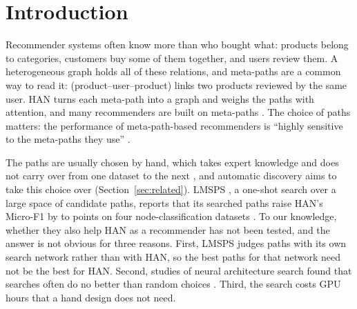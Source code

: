\section{Introduction}
\label{sec:intro}

Recommender systems often know more than who bought what: products belong to categories,
customers buy some of them together, and users review them. A heterogeneous graph holds all of
these relations, and meta-paths are a common way to read it:  (product--user--product)
links two products reviewed by the same user. HAN \citep{wang2019heterogeneous} turns each
meta-path into a graph and weighs the paths with attention, and many recommenders are built on
meta-paths \citep{hu2018leveraging,shi2020hgrec,mu2021fhrec,yan2021attention}. The choice of paths
matters: the performance of meta-path-based recommenders is ``highly sensitive to the meta-paths
they use'' \citep{ning2022automatic}.

The paths are usually chosen by hand, which takes expert knowledge and does not carry over from
one dataset to the next \citep[][App.~D]{han2020genetic,li2024longrange}, and automatic discovery
aims to take this choice over (Section~\ref{sec:related}). LMSPS \citep{li2024longrange}, a one-shot
search over a large space of candidate paths, reports that its searched paths raise HAN's Micro-F1
by  to  points on four node-classification datasets
\citep[Table~4]{li2024longrange}. To our knowledge, whether they also help HAN as a recommender has
not been tested, and the answer is not obvious for three reasons. First, LMSPS judges paths with its
own search network rather than with HAN, so the best paths for that network need not be the best for
HAN. Second, studies of neural architecture search found that searches often do no better than
random choices \citep{li2019random,yu2020evaluating}. Third, the search costs GPU hours that a
hand design does not need.

